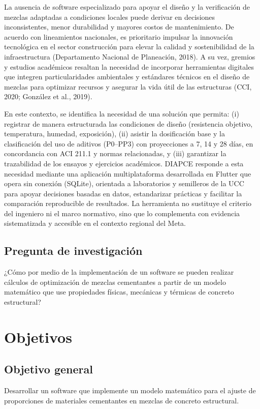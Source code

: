 \documentclass[12pt, letterpaper]{article}
\begin{document}
La ausencia de software especializado para apoyar el diseño y la verificación de mezclas adaptadas a condiciones locales puede derivar en decisiones inconsistentes, menor durabilidad y mayores costos de mantenimiento. De acuerdo con lineamientos nacionales, es prioritario impulsar la innovación tecnológica en el sector construcción para elevar la calidad y sostenibilidad de la infraestructura (Departamento Nacional de Planeación, 2018). A su vez, gremios y estudios académicos resaltan la necesidad de incorporar herramientas digitales que integren particularidades ambientales y estándares técnicos en el diseño de mezclas para optimizar recursos y asegurar la vida útil de las estructuras (CCI, 2020; González et al., 2019).

En este contexto, se identifica la necesidad de una solución que permita: (i) registrar de manera estructurada las condiciones de diseño (resistencia objetivo, temperatura, humedad, exposición), (ii) asistir la dosificación base y la clasificación del uso de aditivos (P0–PP3) con proyecciones a 7, 14 y 28 días, en concordancia con ACI 211.1 y normas relacionadas, y (iii) garantizar la trazabilidad de los ensayos y ejercicios académicos. DIAPCE responde a esta necesidad mediante una aplicación multiplataforma desarrollada en Flutter que opera sin conexión (SQLite), orientada a laboratorios y semilleros de la UCC para apoyar decisiones basadas en datos, estandarizar prácticas y facilitar la comparación reproducible de resultados. La herramienta no sustituye el criterio del ingeniero ni el marco normativo, sino que lo complementa con evidencia sistematizada y accesible en el contexto regional del Meta.


\subsection*{Pregunta de investigación}
¿Cómo por medio de la implementación de un software se pueden realizar cálculos de optimización de mezclas cementantes a partir de un modelo matemático que use propiedades físicas, mecánicas y térmicas de concreto estructural?

\section{Objetivos}
\subsection{Objetivo general}
Desarrollar un software que implemente un modelo matemático para el ajuste de proporciones de materiales cementantes en mezclas de concreto estructural.
\end{document}
